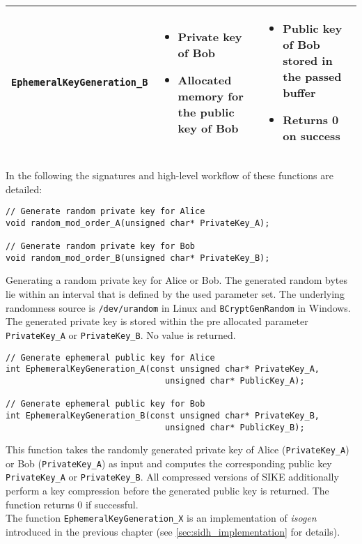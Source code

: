 \begin{table}[H]
\begin{tabular}{| c|m{4.8cm}|m{4.8cm}|}
        \texttt{EphemeralKeyGeneration\_B} &
        \begin{itemize}[noitemsep, leftmargin=*]
            \item Private key of Bob
            \item Allocated memory for the public key of Bob
        \end{itemize} & 
        \begin{itemize}[noitemsep, leftmargin=*]
            \item Public key of Bob stored in the passed buffer
			\item Returns 0 on success
        \end{itemize} \\
        \hline
    \end{tabular}
\end{table}

In the following the signatures and high-level workflow of these functions are detailed:


\begin{lstlisting}[]
// Generate random private key for Alice
void random_mod_order_A(unsigned char* PrivateKey_A);

// Generate random private key for Bob
void random_mod_order_B(unsigned char* PrivateKey_B);
\end{lstlisting}
Generating a random private key for Alice or Bob. The generated random bytes lie within an interval that is defined by the used parameter set. The underlying randomness source is \texttt{/dev/urandom} in Linux and \texttt{BCryptGenRandom} in Windows. The generated private key is stored within the pre allocated parameter \texttt{PrivateKey\_A} or \texttt{PrivateKey\_B}. No value is returned.

\begin{lstlisting}[]
// Generate ephemeral public key for Alice
int EphemeralKeyGeneration_A(const unsigned char* PrivateKey_A,
							    unsigned char* PublicKey_A);
							    
// Generate ephemeral public key for Bob
int EphemeralKeyGeneration_B(const unsigned char* PrivateKey_B,
							    unsigned char* PublicKey_B);
\end{lstlisting}
This function takes the randomly generated private key of Alice (\texttt{PrivateKey\_A}) or Bob (\texttt{PrivateKey\_A}) as input and computes the corresponding public key \texttt{PrivateKey\_A} or \texttt{PrivateKey\_B}. All compressed versions of \gls{SIKE} additionally perform a key compression before the generated public key is returned. The function returns 0 if successful.\\
The function \texttt{EphemeralKeyGeneration\_X} is an implementation of \textit{isogen} introduced in the previous chapter (see \autoref{sec:sidh_implementation} for details).

